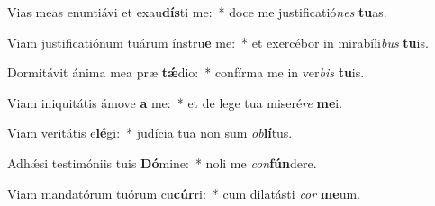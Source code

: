 \item Vias meas enuntiávi et exau\textbf{dís}ti me:~* doce me justificatió\textit{nes} \textbf{tu}as.
\item Viam justificatiónum tuárum ínstru\textbf{e} me:~* et exercébor in mirabíli\textit{bus} \textbf{tu}is.
\item Dormitávit ánima mea præ \textbf{tǽ}dio:~* confírma me in ver\textit{bis} \textbf{tu}is.
\item Viam iniquitátis ámove \textbf{a} me:~* et de lege tua miseré\textit{re} \textbf{me}i.
\item Viam veritátis e\textbf{lé}gi:~* judícia tua non sum \textit{ob}\textbf{lí}tus.
\item Adhǽsi testimóniis tuis \textbf{Dó}mine:~* noli me \textit{con}\textbf{fún}dere.
\item Viam mandatórum tuórum cu\textbf{cúr}ri:~* cum dilatásti \textit{cor} \textbf{me}um.
